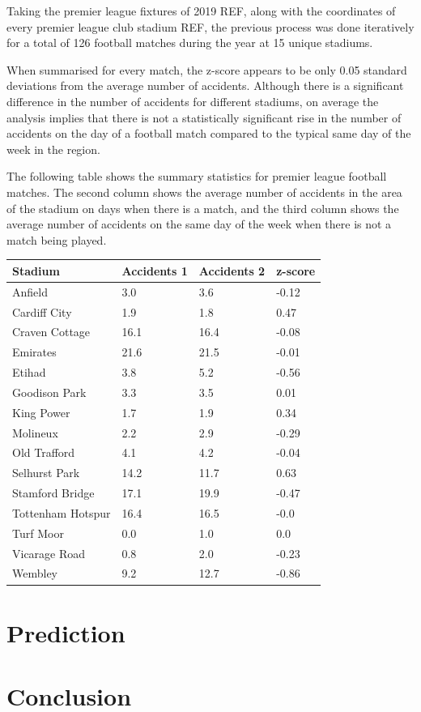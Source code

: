 \documentclass[12pt]{article}
\begin{document}
Taking the premier league fixtures of 2019 REF, along with the coordinates of every premier league club stadium REF, the previous process was done iteratively for a total of 126 football matches during the year at 15 unique stadiums.

When summarised for every match, the z-score appears to be only 0.05 standard deviations from the average number of accidents. Although there is a significant difference in the number of accidents for different stadiums, on average the analysis implies that there is not a statistically significant rise in the number of accidents on the day of a football match compared to the typical same day of the week in the region.

The following table shows the summary statistics for premier league football matches. The second column shows the average number of accidents in the area of the stadium on days when there is a match, and the third column shows the average number of accidents on the same day of the week when there is not a match being played.

\begin{table}[!ht]
    \centering
    \begin{tabular}{|l|l|l|l|}
    \hline
        Stadium & Accidents 1 & Accidents 2 & z-score \\ \hline
        Anfield & 3.0 & 3.6 & -0.12 \\ \hline
        Cardiff City & 1.9 & 1.8 & 0.47 \\ \hline
        Craven Cottage & 16.1 & 16.4 & -0.08 \\ \hline
        Emirates & 21.6 & 21.5 & -0.01 \\ \hline
        Etihad & 3.8 & 5.2 & -0.56 \\ \hline
        Goodison Park & 3.3 & 3.5 & 0.01 \\ \hline
        King Power & 1.7 & 1.9 & 0.34 \\ \hline
        Molineux & 2.2 & 2.9 & -0.29 \\ \hline
        Old Trafford & 4.1 & 4.2 & -0.04 \\ \hline
        Selhurst Park & 14.2 & 11.7 & 0.63 \\ \hline
        Stamford Bridge & 17.1 & 19.9 & -0.47 \\ \hline
        Tottenham Hotspur & 16.4 & 16.5 & -0.0 \\ \hline
        Turf Moor & 0.0 & 1.0 & 0.0 \\ \hline
        Vicarage Road & 0.8 & 2.0 & -0.23 \\ \hline
        Wembley & 9.2 & 12.7 & -0.86 \\ \hline
    \end{tabular}
\end{table}

\section{Prediction}



\section{Conclusion}



\end{document}
